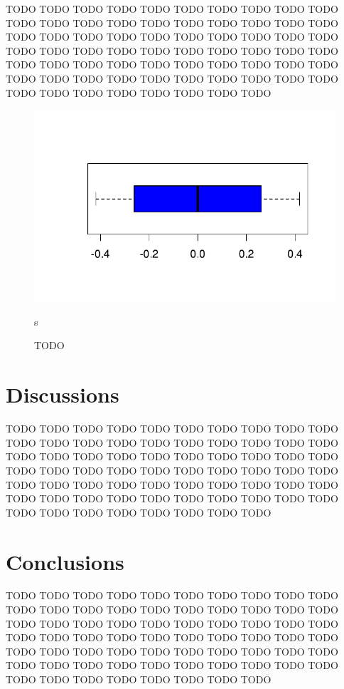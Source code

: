 \documentclass[a4paper, nobind]{templates/cdethesis}
\begin{document}
TODO TODO TODO TODO TODO TODO TODO TODO TODO TODO TODO TODO TODO TODO TODO TODO TODO TODO TODO TODO TODO TODO TODO TODO TODO TODO TODO TODO TODO TODO TODO TODO TODO TODO
TODO TODO TODO TODO TODO TODO TODO TODO TODO TODO TODO TODO TODO TODO TODO TODO TODO TODO TODO TODO TODO TODO TODO TODO TODO TODO TODO TODO TODO TODO TODO TODO TODO TODO

\begin{figure}[!h]
    \centering
    \includegraphics[width=1.1\linewidth]{figures/chapter02/uncertainty.pdf}
    \caption{TODO}s
    \label{fig:figurexy04}
\end{figure}

\hypertarget{discussions}{%
\section{Discussions}\label{discussions}}

TODO TODO TODO TODO TODO TODO TODO TODO TODO TODO TODO TODO TODO TODO TODO TODO TODO TODO TODO TODO TODO TODO TODO TODO TODO TODO TODO TODO TODO TODO TODO TODO TODO TODO
TODO TODO TODO TODO TODO TODO TODO TODO TODO TODO TODO TODO TODO TODO TODO TODO TODO TODO TODO TODO TODO TODO TODO TODO TODO TODO TODO TODO TODO TODO TODO TODO TODO TODO

\hypertarget{conclusions}{%
\section{Conclusions}\label{conclusions}}

TODO TODO TODO TODO TODO TODO TODO TODO TODO TODO TODO TODO TODO TODO TODO TODO TODO TODO TODO TODO TODO TODO TODO TODO TODO TODO TODO TODO TODO TODO TODO TODO TODO TODO
TODO TODO TODO TODO TODO TODO TODO TODO TODO TODO TODO TODO TODO TODO TODO TODO TODO TODO TODO TODO TODO TODO TODO TODO TODO TODO TODO TODO TODO TODO TODO TODO TODO TODO
\end{document}
